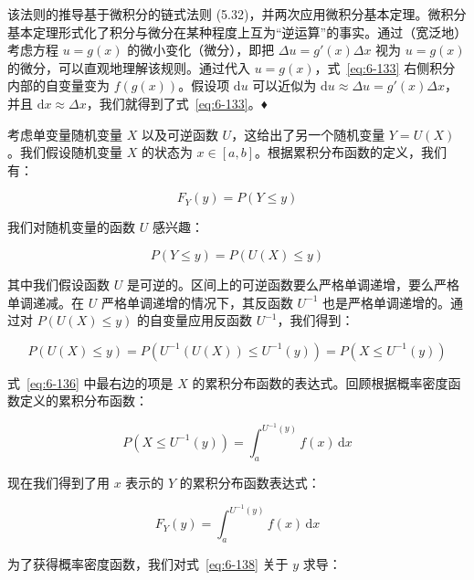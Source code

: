 该法则的推导基于微积分的链式法则 (5.32)，并两次应用微积分基本定理。微积分基本定理形式化了积分与微分在某种程度上互为“逆运算”的事实。通过（宽泛地）考虑方程 $ u = g(x) $ 的微小变化（微分），即把 $ \Delta u = g'(x) \Delta x $ 视为 $ u = g(x) $ 的微分，可以直观地理解该规则。通过代入 $ u = g(x) $，式~\eqref{eq:6-133} 右侧积分内部的自变量变为 $ f(g(x)) $。假设项 $ \mathrm{d}u $ 可以近似为 $ \mathrm{d}u \approx \Delta u = g'(x) \Delta x $，并且 $ \mathrm{d}x \approx \Delta x $，我们就得到了式~\eqref{eq:6-133}。♦

考虑单变量随机变量 $ X $ 以及可逆函数 $ U $，这给出了另一个随机变量 $ Y = U(X) $。我们假设随机变量 $ X $ 的状态为 $ x \in [a, b] $。根据累积分布函数的定义，我们有：

\begin{equation}
F_Y(y) = P(Y \leqslant y)
\tag{6.134}\label{eq:6-134}
\end{equation}

我们对随机变量的函数 $ U $ 感兴趣：

\begin{equation}
P(Y \leqslant y) = P(U(X) \leqslant y)
\tag{6.135}\label{eq:6-135}
\end{equation}

其中我们假设函数 $ U $ 是可逆的。区间上的可逆函数要么严格单调递增，要么严格单调递减。在 $ U $ 严格单调递增的情况下，其反函数 $ U^{-1} $ 也是严格单调递增的。通过对 $ P(U(X) \leqslant y) $ 的自变量应用反函数 $ U^{-1} $，我们得到：

\begin{equation}
P(U(X) \leqslant y) = P(U^{-1}(U(X)) \leqslant U^{-1}(y)) = P(X \leqslant U^{-1}(y))
\tag{6.136}\label{eq:6-136}
\end{equation}

式~\eqref{eq:6-136} 中最右边的项是 $ X $ 的累积分布函数的表达式。回顾根据概率密度函数定义的累积分布函数：

\begin{equation}
P(X \leqslant U^{-1}(y)) = \int_a^{U^{-1}(y)} f(x)\,\mathrm{d}x
\tag{6.137}\label{eq:6-137}
\end{equation}

现在我们得到了用 $ x $ 表示的 $ Y $ 的累积分布函数表达式：

\begin{equation}
F_Y(y) = \int_a^{U^{-1}(y)} f(x)\,\mathrm{d}x
\tag{6.138}\label{eq:6-138}
\end{equation}

为了获得概率密度函数，我们对式~\eqref{eq:6-138} 关于 $ y $ 求导：

